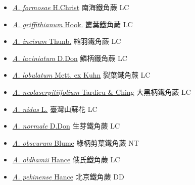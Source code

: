 \begin{itemize}
\begin{itemize}
        \item[] \href{http://www.theplantlist.org/tpl1.1/search?q=Asplenium+formosae}{\textit{A. formosae} H.Christ}   南海鐵角蕨 LC
        \item[] \href{http://www.theplantlist.org/tpl1.1/search?q=Asplenium+griffithianum}{\textit{A. griffithianum} Hook.}   叢葉鐵角蕨 LC
        \item[] \href{http://www.theplantlist.org/tpl1.1/search?q=Asplenium+incisum}{\textit{A. incisum} Thunb.}   縮羽鐵角蕨 LC
        \item[] \href{http://www.theplantlist.org/tpl1.1/search?q=Asplenium+laciniatum}{\textit{A. laciniatum} D.Don}   鱗柄鐵角蕨 LC
        \item[] \href{http://www.theplantlist.org/tpl1.1/search?q=Asplenium+lobulatum}{\textit{A. lobulatum} Mett. ex Kuhn}   裂葉鐵角蕨 LC
        \item[] \href{http://www.theplantlist.org/tpl1.1/search?q=Asplenium+neolaserpitiifolium}{\textit{A. neolaserpitiifolium} Tardieu \& Ching}   大黑柄鐵角蕨 LC
        \item[] \href{http://www.theplantlist.org/tpl1.1/search?q=Asplenium+nidus}{\textit{A. nidus} L.}   臺灣山蘇花 LC
        \item[] \href{http://www.theplantlist.org/tpl1.1/search?q=Asplenium+normale}{\textit{A. normale} D.Don}   生芽鐵角蕨 LC
        \item[] \href{http://www.theplantlist.org/tpl1.1/search?q=Asplenium+obscurum}{\textit{A. obscurum} Blume}   綠柄剪葉鐵角蕨 NT
        \item[] \href{http://www.theplantlist.org/tpl1.1/search?q=Asplenium+oldhamii}{\textit{A. oldhamii} Hance}   俄氏鐵角蕨 LC
        \item[] \href{http://www.theplantlist.org/tpl1.1/search?q=Asplenium+pekinense}{\textit{A. pekinense} Hance}   北京鐵角蕨 DD

\end{itemize}
\end{itemize}

